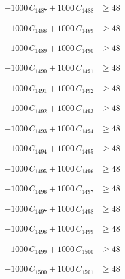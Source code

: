 \documentclass[a4paper,11pt]{article}
\begin{document}
\begin{align}
-1000\,C_{1487} + 1000\,C_{1488} &\geq 48 \nonumber
\end{align}

\begin{align}
-1000\,C_{1488} + 1000\,C_{1489} &\geq 48 \nonumber
\end{align}

\begin{align}
-1000\,C_{1489} + 1000\,C_{1490} &\geq 48 \nonumber
\end{align}

\begin{align}
-1000\,C_{1490} + 1000\,C_{1491} &\geq 48 \nonumber
\end{align}

\begin{align}
-1000\,C_{1491} + 1000\,C_{1492} &\geq 48 \nonumber
\end{align}

\begin{align}
-1000\,C_{1492} + 1000\,C_{1493} &\geq 48 \nonumber
\end{align}

\begin{align}
-1000\,C_{1493} + 1000\,C_{1494} &\geq 48 \nonumber
\end{align}

\begin{align}
-1000\,C_{1494} + 1000\,C_{1495} &\geq 48 \nonumber
\end{align}

\begin{align}
-1000\,C_{1495} + 1000\,C_{1496} &\geq 48 \nonumber
\end{align}

\begin{align}
-1000\,C_{1496} + 1000\,C_{1497} &\geq 48 \nonumber
\end{align}

\begin{align}
-1000\,C_{1497} + 1000\,C_{1498} &\geq 48 \nonumber
\end{align}

\begin{align}
-1000\,C_{1498} + 1000\,C_{1499} &\geq 48 \nonumber
\end{align}

\begin{align}
-1000\,C_{1499} + 1000\,C_{1500} &\geq 48 \nonumber
\end{align}

\begin{align}
-1000\,C_{1500} + 1000\,C_{1501} &\geq 48 \nonumber
\end{align}
\end{document}
